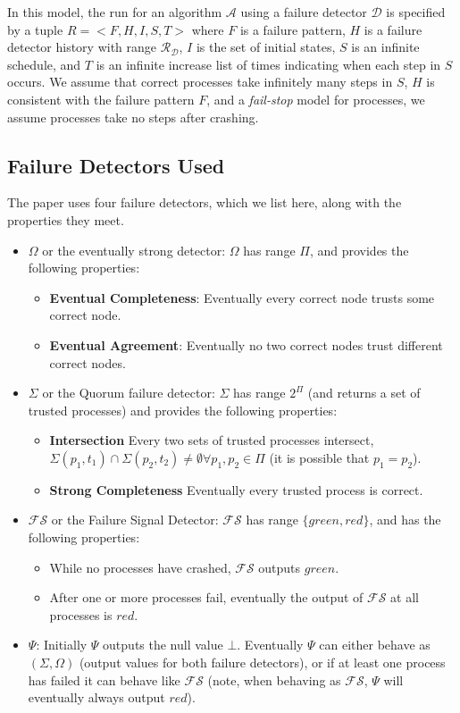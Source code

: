 In this model, the run for an algorithm $\mathcal{A}$ using a failure detector $\mathcal{D}$ is specified by a tuple $R
= <F, H, I, S, T>$ where $F$ is a failure pattern, $H$ is a failure detector history with range
$\mathcal{R}_{\mathcal{D}}$, $I$ is the set of initial states, $S$ is an infinite schedule, and $T$ is an infinite
increase list of times indicating when each step in $S$ occurs. We assume that correct processes take infinitely many
steps in $S$, $H$ is consistent with the failure pattern $F$, and a \emph{fail-stop} model for processes, \ie we assume
processes take no steps after crashing.

\subsection{Failure Detectors Used}
The paper uses four failure detectors, which we list here, along with the properties they meet.
\begin{itemize}
\item \textbf{$\Omega$} or the eventually strong detector: $\Omega$ has range $\Pi$, and provides the
following properties:
\begin{itemize}
\item \textbf{Eventual Completeness}: Eventually every correct node trusts some correct node.
\item \textbf{Eventual Agreement}: Eventually no two correct nodes trust different correct nodes.
\end{itemize}
\item \textbf{$\Sigma$} or the Quorum failure detector: $\Sigma$ has range $2^{\Pi}$ (and returns a set of trusted
processes)  and provides the following properties:
\begin{itemize}
\item \textbf{Intersection} Every two sets of trusted processes intersect, \ie $\Sigma(p_1, t_1) \cap \Sigma(p_2, t_2)
\neq \emptyset \forall p_1, p_2 \in \Pi$ (it is possible that $p_1 = p_2$).
\item \textbf{Strong Completeness} Eventually every trusted process is correct.
\end{itemize}
\item \textbf{$\mathcal{FS}$} or the Failure Signal Detector: $\mathcal{FS}$ has range $\{green, red\}$, and has the
following properties:
\begin{itemize}
\item While no processes have crashed, $\mathcal{FS}$ outputs $green$.
\item After one or more processes fail, eventually the output of $\mathcal{FS}$ at all processes is $red$.
\end{itemize}
\item \textbf{$\Psi$}: Initially $\Psi$ outputs the null value $\bot$. Eventually $\Psi$ can either behave as
$(\Sigma, \Omega)$ (\ie output values for both failure detectors), or if at least one process has failed it
can behave like $\mathcal{FS}$ (note, when behaving as $\mathcal{FS}$, $\Psi$ will eventually always output $red$).
\end{itemize}

